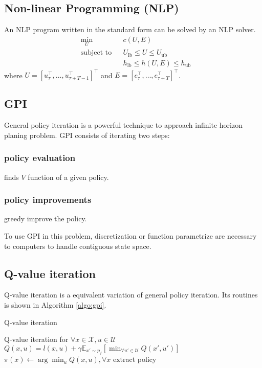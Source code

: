 \documentclass[conference]{IEEEtran}
\begin{document}
\subsection{Non-linear Programming (NLP)}
An NLP program written in the standard form can be solved by an NLP solver.
\[
\begin{aligned}
&\min_{{U}} & & c({U}, {E}) \\
&\text{subject to} & & {U}_{\text{lb}} \leq {U} \leq {U}_{\text{ub}} \\
& & & {h}_{\text{lb}} \leq {h}({U}, {E}) \leq {h}_{\text{ub}}
\end{aligned}
\]
where \( {U} = [{u}_\tau^\top, \ldots, {u}_{\tau+T-1}^\top]^\top \) and \( {E} = [{e}_\tau^\top, \ldots, {e}_{\tau+T}^\top]^\top \).

\subsection{GPI}
General policy iteration is a powerful technique to approach 
infinite horizon planing problem.
GPI consists of iterating two steps:
\subsubsection{policy evaluation} finds $V$ function of a given policy.
\subsubsection{policy improvements} greedy improve the policy.

To use GPI in this problem, discretization or function parametrize are necessary
to computers to handle contiguous state space.

\subsection{Q-value iteration}
Q-value iteration is a equivalent variation of general policy iteration.
Its routines is shown in Algorithm \ref{algo:gpi}.
\begin{algorithm}
    \caption{Q-value iteration}
    \label{algo:gpi}
    \begin{algorithmic}[1] %
        \Comment Q-value iteration
        \State for $\forall x \in \mathcal{X}, u \in \mathcal{U}$
        \State $Q(x,u) = l(x,u) + \gamma \mathbb{E}_{x'\sim p_f}\left[\min_{\forall u' \in \mathcal{U}} Q(x', u')\right]$
    \EndWhile
    \State $\pi(x) \leftarrow \arg\min_u Q(x, u), \forall x$
    \Comment extract policy
    \end{algorithmic}
\end{algorithm}
\end{document}
